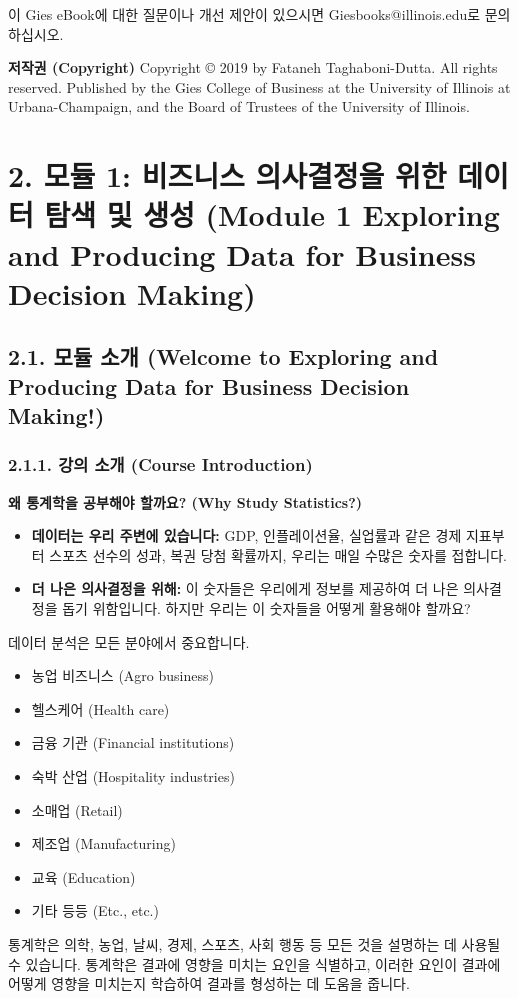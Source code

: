 \documentclass[11pt,a4paper]{book}
\theoremstyle{definition}
\begin{document}
이 Gies eBook에 대한 질문이나 개선 제안이 있으시면 Giesbooks@illinois.edu로 문의하십시오.

\textbf{저작권 (Copyright)}
Copyright © 2019 by Fataneh Taghaboni-Dutta. All rights reserved.
Published by the Gies College of Business at the University of Illinois at Urbana-Champaign, and the Board of Trustees of the University of Illinois.


\section{2. 모듈 1: 비즈니스 의사결정을 위한 데이터 탐색 및 생성 (Module 1 Exploring and Producing Data for Business Decision Making)}

\subsection{2.1. 모듈 소개 (Welcome to Exploring and Producing Data for Business Decision Making!)}

\subsubsection{2.1.1. 강의 소개 (Course Introduction)}

\begin{examplebox}
\textbf{왜 통계학을 공부해야 할까요? (Why Study Statistics?)}
\begin{itemize}
    \item \textbf{데이터는 우리 주변에 있습니다:} GDP, 인플레이션율, 실업률과 같은 경제 지표부터 스포츠 선수의 성과, 복권 당첨 확률까지, 우리는 매일 수많은 숫자를 접합니다.
    \item \textbf{더 나은 의사결정을 위해:} 이 숫자들은 우리에게 정보를 제공하여 더 나은 의사결정을 돕기 위함입니다. 하지만 우리는 이 숫자들을 어떻게 활용해야 할까요?
\end{itemize}
\end{examplebox}

\begin{tcolorbox}[title={데이터 분석의 중요성}, colback=white, colframe=black!20!white]
데이터 분석은 모든 분야에서 중요합니다.
\begin{itemize}
    \item 농업 비즈니스 (Agro business)
    \item 헬스케어 (Health care)
    \item 금융 기관 (Financial institutions)
    \item 숙박 산업 (Hospitality industries)
    \item 소매업 (Retail)
    \item 제조업 (Manufacturing)
    \item 교육 (Education)
    \item 기타 등등 (Etc., etc.)
\end{itemize}
통계학은 의학, 농업, 날씨, 경제, 스포츠, 사회 행동 등 모든 것을 설명하는 데 사용될 수 있습니다. 통계학은 결과에 영향을 미치는 요인을 식별하고, 이러한 요인이 결과에 어떻게 영향을 미치는지 학습하여 결과를 형성하는 데 도움을 줍니다.
\end{tcolorbox}
\end{document}
